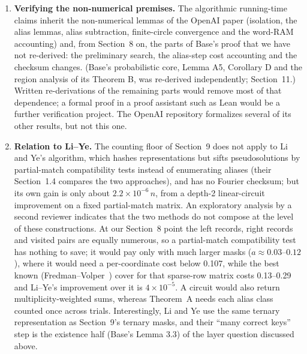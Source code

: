 \documentclass[11pt]{article}
\newcommand{\E}{\mathbb{E}}
\theoremstyle{plain}
\begin{document}
\begin{enumerate}
For amplitude tilting, define, for fixed densities and multiplier $p$, and for $c$ near 1,
\[
\psi(c)=\log_2\int_{\mathbb T}2^{c\lambda(x)+p(\Delta-u(x))}\,dx,
\qquad \lambda(x)=\log_2(2+2\cos x).
\]
Thus $\psi(1)=\log_2 M_1$ and $\psi'(1)=\E_{\nu_1}\lambda$, where $\nu_1$ is the normalized integrand at $c=1$. Also $\partial_p\log_2 M_1=\Delta-\E_{\nu_1}u$. At an interior minimum with respect to $p$, the latter derivative vanishes. This identity alone does not prove a global minimax statement or identify the two moments' maximizing types. In the tested joint optimizations of densities, amplitude tilts, cutoffs and affine certificates, the amplitude coefficient returned to 1. Separate sampling-budget and threshold variations also gave no improvement in the tested model. A rigorous obstruction for these richer estimator families remains open.
\item \textbf{Verifying the non-numerical premises.} The algorithmic running-time claims inherit the non-numerical lemmas of the OpenAI paper (isolation, the alias lemmas, alias subtraction, finite-circle convergence and the word-RAM accounting) and, from Section~8 on, the parts of Base's proof that we have not re-derived: the preliminary search, the alias-step cost accounting and the checksum changes. (Base's probabilistic core, Lemma A5, Corollary D and the region analysis of its Theorem B, was re-derived independently; Section~11.) Written re-derivations of the remaining parts would remove most of that dependence; a formal proof in a proof assistant such as Lean would be a further verification project. The OpenAI repository formalizes several of its other results, but not this one.
\item \textbf{Relation to Li--Ye.} The counting floor of Section~9 does not apply to Li and Ye's algorithm, which hashes representations but sifts pseudosolutions by partial-match compatibility tests instead of enumerating aliases (their Section~1.4 compares the two approaches), and has no Fourier checksum; but its own gain is only about $2.2\times10^{-6}\, n$, from a depth-2 linear-circuit improvement on a fixed partial-match matrix. An exploratory analysis by a second reviewer indicates that the two methods do not compose at the level of these constructions. At our Section~8 point the left records, right records and visited pairs are equally numerous, so a partial-match compatibility test has nothing to save; it would pay only with much larger masks ($a \approx 0.03$--$0.12$), where it would need a per-coordinate cost below 0.107, while the best known (Fredman--Volper~\cite{fv}) cover for that sparse-row matrix costs 0.13--0.29 and Li--Ye's improvement over it is $4\times10^{-5}$. A circuit would also return multiplicity-weighted sums, whereas Theorem~A needs each alias class counted once across trials. Interestingly, Li and Ye use the same ternary representation as Section~9's ternary masks, and their ``many correct keys'' step is the existence half (Base's Lemma 3.3) of the layer question discussed above.
\end{enumerate}
\end{document}
